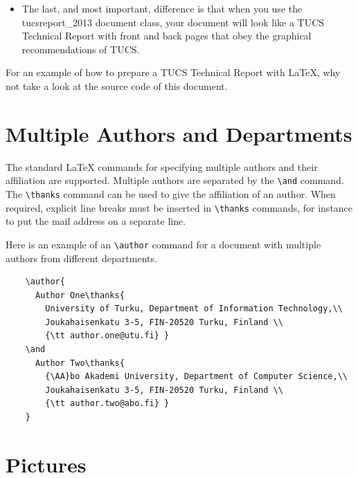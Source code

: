 \documentclass[12pt]{tucsreport_2013}
\begin{document}
\begin{itemize}
	Instructions for obtaining technical report number and ISBN number
	for a new report can be found on the TUCS' web pages.
	
	Note,
	when setting the \texttt{date} field, just give the month and year.
	For example \verb"\date{August 2013}". If you do not set the date field,
	it will default to the current month and year.
	
      \item
	The last, and most important, difference is that when you use the
	  \textsf{tucsreport\_2013} document class, your document will look like
	  a TUCS Technical Report with front and back pages that obey
	  the graphical recommendations of TUCS.
    \end{itemize}

    For an example of how to prepare a TUCS Technical Report with
    {\LaTeX}, why not take a look at the source code of this document.


  \section{Multiple Authors and Departments}
    The standard {\LaTeX} commands for specifying multiple authors and
      their affiliation are supported. Multiple authors are separated by the
      \verb"\and" command. The \verb"\thanks" command can be used to
      give the affiliation of an author. When required, explicit line breaks
      must be inserted in \verb"\thanks" commands, for instance to put the
      mail address on a separate line.

    Here is an example of an \verb"\author" command for a document with
      multiple authors from different departments.
    {\footnotesize\begin{verbatim}
	\author{
	  Author One\thanks{
	    University of Turku, Department of Information Technology,\\
	    Joukahaisenkatu 3-5, FIN-20520 Turku, Finland \\
	    {\tt author.one@utu.fi} }
	\and
	  Author Two\thanks{
	    {\AA}bo Akademi University, Department of Computer Science,\\
	    Joukahaisenkatu 3-5, FIN-20520 Turku, Finland \\
	    {\tt author.two@abo.fi} }
	}
    \end{verbatim}}


\section{Pictures}
\end{document}
